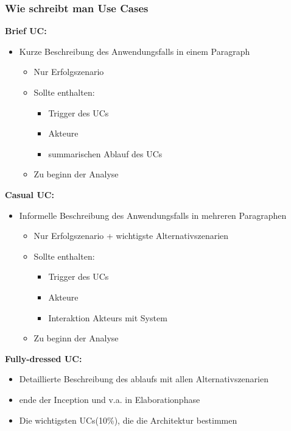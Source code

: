 \documentclass[../ZF_SWEN1.tex]{subfiles}
\begin{document}
\subsubsection{Wie schreibt man Use Cases}

\colorbox {orange!30}{\textbf{Brief UC:}}
\begin{itemize}
	\item Kurze Beschreibung des Anwendungsfalls in einem Paragraph
	\begin{itemize}
		\item Nur Erfolgszenario
		\item Sollte enthalten:
		\begin{itemize}
			\item Trigger des UCs
			\item Akteure
			\item summarischen Ablauf des UCs
		\end{itemize}
		\item Zu beginn der Analyse
	\end{itemize}
\end{itemize}

\colorbox {orange!30}{\textbf{Casual UC:}}
\begin{itemize}
	\item Informelle Beschreibung des Anwendungsfalls in mehreren Paragraphen
	\begin{itemize}
		\item Nur Erfolgszenario + wichtigste Alternativszenarien
		\item Sollte enthalten:
		\begin{itemize}
			\item Trigger des UCs
			\item Akteure
			\item Interaktion Akteurs mit System
		\end{itemize}
		\item Zu beginn der Analyse
	\end{itemize}
\end{itemize}
\colorbox {orange!30}{\textbf{Fully-dressed UC:}}
\begin{itemize}
	\item Detaillierte Beschreibung des ablaufs mit allen Alternativszenarien

		\item ende der Inception und v.a. in Elaborationphase
		\item Die wichtigsten UCs(10\%), die die Architektur bestimmen
\end{itemize}
\end{document}
